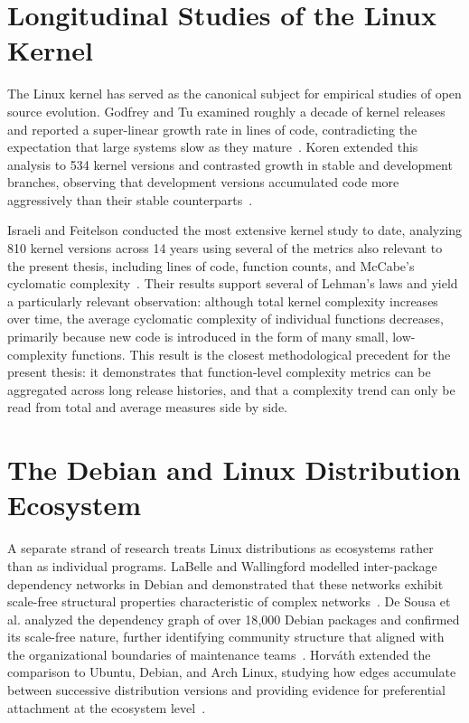 \section{Longitudinal Studies of the Linux Kernel}
\label{sec:rw_kernel}

The Linux kernel has served as the canonical subject for empirical studies of open source evolution. Godfrey and Tu examined roughly a decade of kernel releases and reported a super-linear growth rate in lines of code, contradicting the expectation that large systems slow as they mature~\cite{godfrey2000linux}. Koren extended this analysis to 534 kernel versions and contrasted growth in stable and development branches, observing that development versions accumulated code more aggressively than their stable counterparts~\cite{koren2006linux}.

Israeli and Feitelson conducted the most extensive kernel study to date, analyzing 810 kernel versions across 14 years using several of the metrics also relevant to the present thesis, including lines of code, function counts, and McCabe's cyclomatic complexity~\cite{israeli2010linux}. Their results support several of Lehman's laws and yield a particularly relevant observation: although total kernel complexity increases over time, the average cyclomatic complexity of individual functions decreases, primarily because new code is introduced in the form of many small, low-complexity functions. This result is the closest methodological precedent for the present thesis: it demonstrates that function-level complexity metrics can be aggregated across long release histories, and that a complexity trend can only be read from total and average measures side by side.

\section{The Debian and Linux Distribution Ecosystem}
\label{sec:rw_distribution}

A separate strand of research treats Linux distributions as ecosystems rather than as individual programs. LaBelle and Wallingford modelled inter-package dependency networks in Debian and demonstrated that these networks exhibit scale-free structural properties characteristic of complex networks~\cite{interPackageDependency}. De Sousa et al. analyzed the dependency graph of over 18{,}000 Debian packages and confirmed its scale-free nature, further identifying community structure that aligned with the organizational boundaries of maintenance teams~\cite{sousa2009debian}. Horváth extended the comparison to Ubuntu, Debian, and Arch Linux, studying how edges accumulate between successive distribution versions and providing evidence for preferential attachment at the ecosystem level~\cite{horvath2012linuxdeps}.

